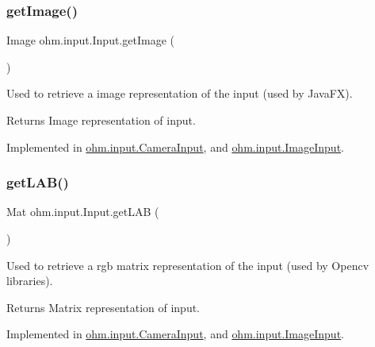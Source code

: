 \subsubsection{\texorpdfstring{get\+Image()}{getImage()}}
{\footnotesize\ttfamily Image ohm.\+input.\+Input.\+get\+Image (\begin{DoxyParamCaption}{ }\end{DoxyParamCaption})}

Used to retrieve a image representation of the input (used by Java\+FX). \begin{DoxyReturn}{Returns}
Image representation of input. 
\end{DoxyReturn}


Implemented in \hyperlink{classohm_1_1input_1_1_camera_input_a5d34760a889c9e574f8e3050bde679b6}{ohm.\+input.\+Camera\+Input}, and \hyperlink{classohm_1_1input_1_1_image_input_a68160a9bd9d395f7b2646e9b55388198}{ohm.\+input.\+Image\+Input}.

\hypertarget{interfaceohm_1_1input_1_1_input_a3264bf8e72c6442076453b5d356b6534}{}\label{interfaceohm_1_1input_1_1_input_a3264bf8e72c6442076453b5d356b6534} 
\subsubsection{\texorpdfstring{get\+L\+A\+B()}{getLAB()}}
{\footnotesize\ttfamily Mat ohm.\+input.\+Input.\+get\+L\+AB (\begin{DoxyParamCaption}{ }\end{DoxyParamCaption})}

Used to retrieve a rgb matrix representation of the input (used by Opencv libraries). \begin{DoxyReturn}{Returns}
Matrix representation of input. 
\end{DoxyReturn}


Implemented in \hyperlink{classohm_1_1input_1_1_camera_input_a1cee784ad09131e95ded21d07a42c8d4}{ohm.\+input.\+Camera\+Input}, and \hyperlink{classohm_1_1input_1_1_image_input_a4f55591040c8129f3768948525d34863}{ohm.\+input.\+Image\+Input}.

\hypertarget{interfaceohm_1_1input_1_1_input_ac9877f2cacdb85c06af084fd426495fd}{}\label{interfaceohm_1_1input_1_1_input_ac9877f2cacdb85c06af084fd426495fd} 
